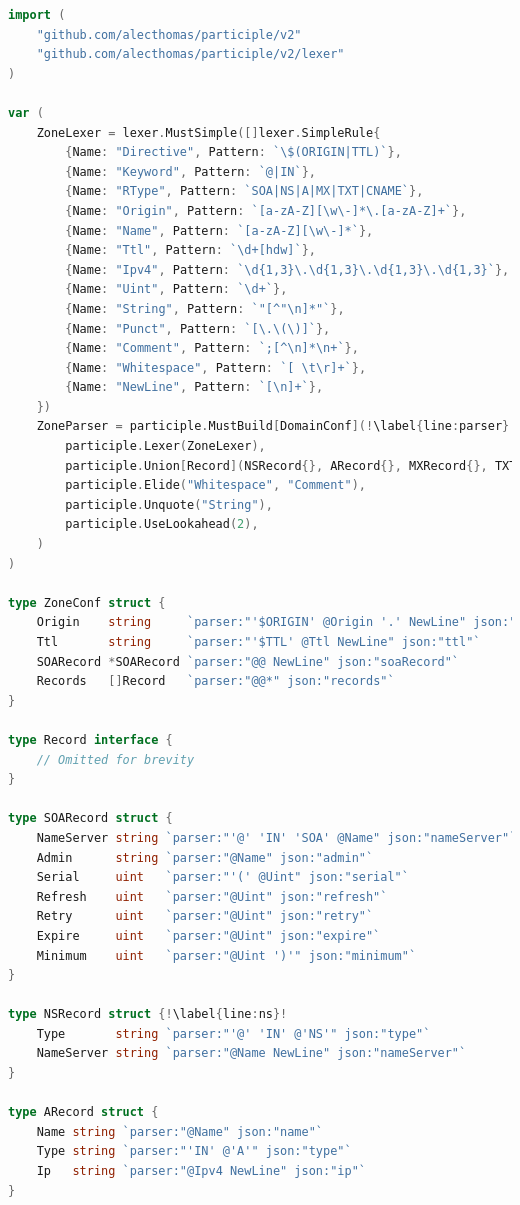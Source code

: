 \begin{lstlisting}[frame=single, language=Go, escapechar=!, caption=Implementación en Go del \textit{parser} para los archivos de zona.]
import (
    "github.com/alecthomas/participle/v2"
	"github.com/alecthomas/participle/v2/lexer"
)

var (
    ZoneLexer = lexer.MustSimple([]lexer.SimpleRule{
        {Name: "Directive", Pattern: `\$(ORIGIN|TTL)`},
        {Name: "Keyword", Pattern: `@|IN`},
        {Name: "RType", Pattern: `SOA|NS|A|MX|TXT|CNAME`},
        {Name: "Origin", Pattern: `[a-zA-Z][\w\-]*\.[a-zA-Z]+`},
        {Name: "Name", Pattern: `[a-zA-Z][\w\-]*`},
        {Name: "Ttl", Pattern: `\d+[hdw]`},
        {Name: "Ipv4", Pattern: `\d{1,3}\.\d{1,3}\.\d{1,3}\.\d{1,3}`},
        {Name: "Uint", Pattern: `\d+`},
        {Name: "String", Pattern: `"[^"\n]*"`},
        {Name: "Punct", Pattern: `[\.\(\)]`},
        {Name: "Comment", Pattern: `;[^\n]*\n+`},
        {Name: "Whitespace", Pattern: `[ \t\r]+`},
        {Name: "NewLine", Pattern: `[\n]+`},
    })
    ZoneParser = participle.MustBuild[DomainConf](!\label{line:parser}!
        participle.Lexer(ZoneLexer),
        participle.Union[Record](NSRecord{}, ARecord{}, MXRecord{}, TXTRecord{}, CNAMERecord{}),!\label{line:union-gen}!
        participle.Elide("Whitespace", "Comment"),
        participle.Unquote("String"),
        participle.UseLookahead(2),
    )
)

type ZoneConf struct {
	Origin    string     `parser:"'$ORIGIN' @Origin '.' NewLine" json:"origin"`
	Ttl       string     `parser:"'$TTL' @Ttl NewLine" json:"ttl"`
	SOARecord *SOARecord `parser:"@@ NewLine" json:"soaRecord"`
	Records   []Record   `parser:"@@*" json:"records"`
}

type Record interface {
    // Omitted for brevity
}

type SOARecord struct {
	NameServer string `parser:"'@' 'IN' 'SOA' @Name" json:"nameServer"`
	Admin      string `parser:"@Name" json:"admin"`
	Serial     uint   `parser:"'(' @Uint" json:"serial"`
	Refresh    uint   `parser:"@Uint" json:"refresh"`
	Retry      uint   `parser:"@Uint" json:"retry"`
	Expire     uint   `parser:"@Uint" json:"expire"`
	Minimum    uint   `parser:"@Uint ')'" json:"minimum"`
}

type NSRecord struct {!\label{line:ns}!
	Type       string `parser:"'@' 'IN' @'NS'" json:"type"`
	NameServer string `parser:"@Name NewLine" json:"nameServer"`
}

type ARecord struct {
	Name string `parser:"@Name" json:"name"`
	Type string `parser:"'IN' @'A'" json:"type"`
	Ip   string `parser:"@Ipv4 NewLine" json:"ip"`
}


\end{lstlisting}
